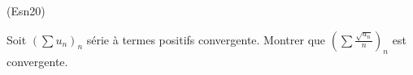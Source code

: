 \begin{tiny}(Esn20)\end{tiny} Soit $\left( \sum u_n\right)_n $ série à termes positifs convergente. Montrer que $\left( \sum \frac{\sqrt{u_n}}{n}\right)_n$ est convergente.